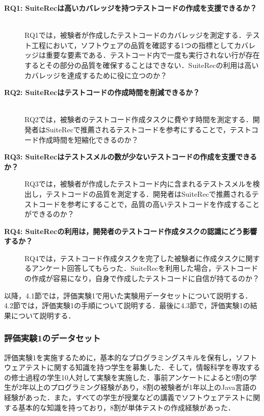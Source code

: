 \documentclass[12pt]{jarticle} %
\begin{document}
\begin{description}
\item[\textbf{RQ1: {\sf SuiteRec}は高いカバレッジを持つテストコードの作成を支援できるか？}]~\\
RQ1では，被験者が作成したテストコードのカバレッジを測定する．テスト工程において，ソフトウェアの品質を確認する1つの指標としてカバレッジは重要な要素である．テストコード内で一度も実行されない行が存在するとその部分の品質を確保することはできない．{\sf SuiteRec}の利用は高いカバレッジを達成するために役に立つのか？
\item[\textbf{RQ2: {\sf SuiteRec}はテストコードの作成時間を削減できるか？}]~\\
RQ2では，被験者のテストコード作成タスクに費やす時間を測定する．開発者は{\sf SuiteRec}で推薦されるテストコードを参考にすることで，テストコード作成時間を短縮化できるのか？
\item[\textbf{RQ3: {\sf SuiteRec}はテストスメルの数が少ないテストコードの作成を支援できるか？}]
RQ3では，被験者が作成したテストコード内に含まれるテストスメルを検出し，テストコードの品質を測定する．開発者は{\sf SuiteRec}で推薦されるテストコードを参考にすることで，品質の高いテストコードを作成することができるのか？
\item[\textbf{RQ4: {\sf SuiteRec}の利用は，開発者のテストコード作成タスクの認識にどう影響するか？}]
RQ4では，テストコード作成タスクを完了した被験者に作成タスクに関するアンケート回答してもらった．{\sf SuiteRec}を利用した場合，テストコードの作成が容易になり，自身で作成したテストコードに自信が持てるのか？
\end{description}

以降，4.1節では，評価実験1で用いた実験用データセットについて説明する．4.2節では，評価実験1の手順について説明する．最後に4.3節で，評価実験1の結果について説明する．


\subsubsection{評価実験1のデータセット}

評価実験1を実施するために，基本的なプログラミングスキルを保有し，ソフトウェアテストに関する知識を持つ学生を募集した．そして，情報科学を専攻するの修士過程の学生10人対して実験を実施した．事前アンケートによると9割の学生が2年以上のプログラミング経験があり，8割の被験者が1年以上のJava言語の経験があった．また，すべての学生が授業などの講義でソフトウェアテストに関する基本的な知識を持っており，8割が単体テストの作成経験があった．
\end{document}

